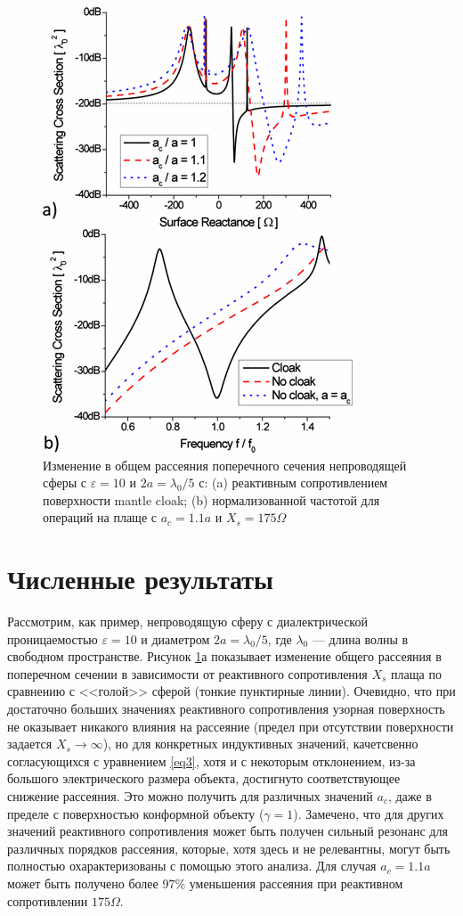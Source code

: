 \documentclass[12pt,a4paper]{article}
\begin{document}
\begin{figure}[t]
  \centering
  \includegraphics[height=0.3\paperheight, width=0.4\paperwidth]{2.png}
  \caption{Изменение в общем рассеяния поперечного сечения непроводящей сферы с $\varepsilon
  =10$ и $2a=\lambda_0/5$ с: (a) реактивным сопротивлением поверхности mantle cloak; (b)
  нормализованной частотой для операций на плаще с $a_c=1.1a$ и $X_s=175\Omega$}
  \label{fig:2}
\end{figure}

\section{Численные результаты}
Рассмотрим, как пример, непроводящую сферу с диалектрической проницаемостью $\varepsilon=10$ 
и диаметром $2a=\lambda_0/5$, где $\lambda_0$ --- длина волны в свободном пространстве. 
Рисунок \ref{fig:2}а показывает изменение общего рассеяния в поперечном сечении в 
зависимости от реактивного сопротивления $X_s$ плаща по сравнению с <<голой>> сферой
(тонкие пунктирные линии). Очевидно, что при достаточно больших значениях реактивного 
сопротивления узорная поверхность не оказывает никакого влияния на рассеяние (предел при
отсутствии поверхности задается $X_s \to \infty$), но для конкретных индуктивных значений,
качетсвенно согласующихся с уравнением \ref{eq3}, хотя и с некоторым отклонением, из-за
большого электрического размера объекта, достигнуто соответствующее снижение рассеяния.
Это можно получить для различных значений $a_c$, даже в пределе с поверхностью конформной
объекту ($\gamma=1$). Замечено, что для других значений реактивного сопротивления может
быть получен сильный резонанс для различных порядков рассеяния, которые, хотя здесь и не
релевантны, могут быть полностью охарактеризованы с помощью этого анализа. Для случая
$a_c=1.1a$ может быть получено более 97\% уменьшения рассеяния при реактивном сопротивлении
$175\Omega$.
\end{document}
